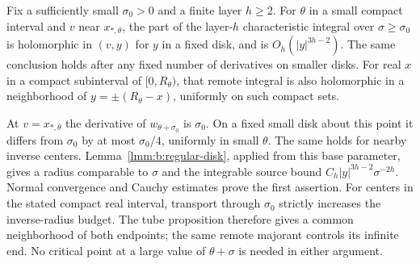 \begin{crl}\label{crl:b:remote}
Fix a sufficiently small $\sigma_0>0$ and a finite layer $h\geq2$.
For $\theta$ in a small compact interval and $v$ near
$x_{*,\theta}$, the part of the layer-$h$ characteristic integral
over $\sigma\geq\sigma_0$ is holomorphic in $(v,y)$ for $y$ in
a fixed disk, and is $O_h(|y|^{3h-2})$. The same conclusion holds
after any fixed number of derivatives on smaller disks.
For real $x$ in a compact subinterval of $[0,R_\theta)$, that
remote integral is also holomorphic in a neighborhood of
$y=\pm(R_\theta-x)$, uniformly on such compact sets.
\end{crl}
\begin{prf}
At $v=x_{*,\theta}$ the derivative of $w_{\theta+\sigma_0}$ is
$\sigma_0$. On a fixed small disk about this point it differs
from $\sigma_0$ by at most $\sigma_0/4$, uniformly in small
$\theta$. The same holds for nearby inverse centers.
Lemma~\ref{lmm:b:regular-disk}, applied from this base parameter,
gives a radius comparable to $\sigma$ and the integrable source
bound $C_h|y|^{3h-2}\sigma^{-2h}$. Normal convergence and Cauchy
estimates prove the first assertion.
For centers in the stated compact real interval, transport through
$\sigma_0$ strictly increases the inverse-radius budget. The tube
proposition therefore gives a common neighborhood of both endpoints;
the same remote majorant controls its infinite end. No critical point
at a large value of $\theta+\sigma$ is needed in either argument.
\end{prf}
